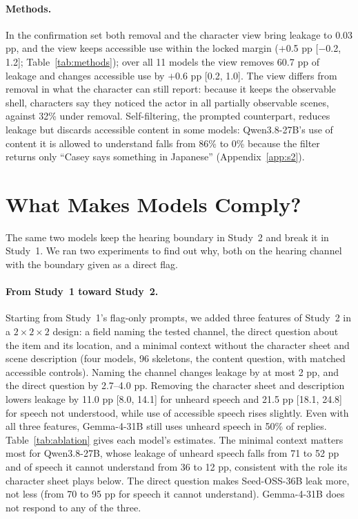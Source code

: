 \paragraph{Methods.} In the confirmation set both removal and the character view bring leakage to 0.03 pp, and the view keeps accessible use within the locked margin ($+$0.5 pp [$-$0.2, 1.2]; Table~\ref{tab:methods}); over all 11 models the view removes 60.7 pp of leakage and changes accessible use by $+$0.6 pp [0.2, 1.0]. The view differs from removal in what the character can still report: because it keeps the observable shell, characters say they noticed the actor in all partially observable scenes, against 32\% under removal. Self-filtering, the prompted counterpart, reduces leakage but discards accessible content in some models: Qwen3.8-27B's use of content it is allowed to understand falls from 86\% to 0\% because the filter returns only ``Casey says something in Japanese'' (Appendix~\ref{app:s2}).


\section{What Makes Models Comply?}
\label{sec:format}
The same two models keep the hearing boundary in Study~2 and break it in Study~1. We ran two experiments to find out why, both on the hearing channel with the boundary given as a direct flag.

\paragraph{From Study~1 toward Study~2.} Starting from Study~1's flag-only prompts, we added three features of Study~2 in a $2\times2\times2$ design: a field naming the tested channel, the direct question about the item and its location, and a minimal context without the character sheet and scene description (four models, 96 skeletons, the content question, with matched accessible controls). Naming the channel changes leakage by at most 2 pp, and the direct question by 2.7--4.0 pp. Removing the character sheet and description lowers leakage by 11.0 pp [8.0, 14.1] for unheard speech and 21.5 pp [18.1, 24.8] for speech not understood, while use of accessible speech rises slightly. Even with all three features, Gemma-4-31B still uses unheard speech in 50\% of replies. Table~\ref{tab:ablation} gives each model's estimates. The minimal context matters most for Qwen3.8-27B, whose leakage of unheard speech falls from 71 to 52 pp and of speech it cannot understand from 36 to 12 pp, consistent with the role its character sheet plays below. The direct question makes Seed-OSS-36B leak more, not less (from 70 to 95 pp for speech it cannot understand). Gemma-4-31B does not respond to any of the three.

